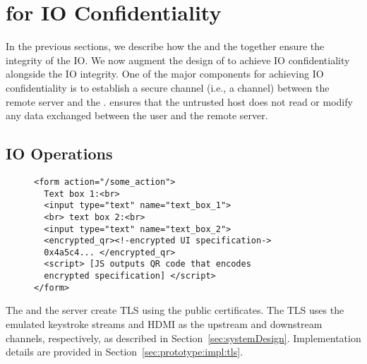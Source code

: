 \section{\name for IO Confidentiality}
\label{sec:confidentiality}


In the previous sections, we describe how the \name \js and the \device together ensure the integrity of the IO. We now augment the design of \name to achieve IO confidentiality alongside the IO integrity. One of the major components for achieving IO confidentiality is to establish a secure channel (i.e., a \tls channel) between the remote server and the \device. \tls ensures that the untrusted host does not read or modify any data exchanged between the user and the remote server.


\subsection{IO Operations}
\label{sec:confidentiality:io}

\begin{figure}[t]
\small
\begin{lstlisting}[mathescape=true]
<form action="/some_action">
  Text box 1:<br>
  <input type="text" name="text_box_1">
  <br> text box 2:<br>
  <input type="text" name="text_box_2">
  <encrypted_qr><!-encrypted UI specification->
  0x4a5c4... </encrypted_qr>
  <script> [JS outputs QR code that encodes 
  encrypted specification] </script>
</form> 
\end{lstlisting}
\spacesave 
\end{figure}




 The \device and the server create TLS using the public certificates. The TLS uses the emulated keystroke streams and HDMI as the upstream and downstream channels, respectively, as described in Section~\ref{sec:systemDesign}. Implementation details are provided in Section~\ref{sec:prototype:impl:tls}. 

